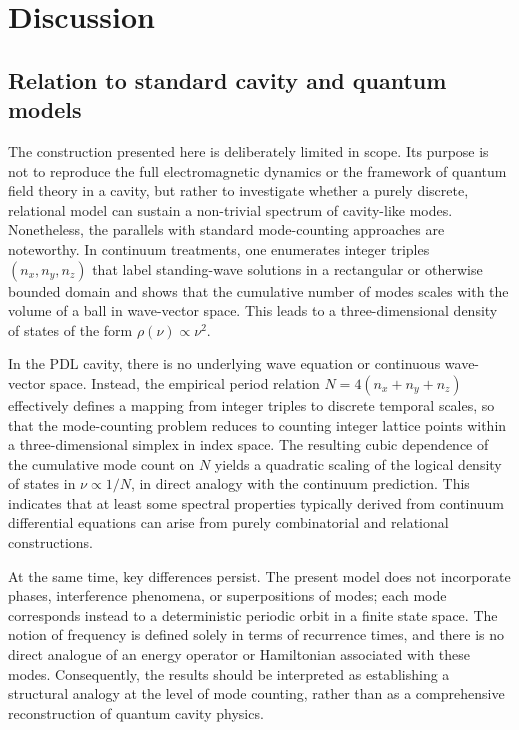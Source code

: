 \documentclass{article}
\theoremstyle{definition}
\begin{document}
\section{Discussion}

\subsection{Relation to standard cavity and quantum models}

The construction presented here is deliberately limited in scope. Its purpose is not to reproduce the full electromagnetic dynamics or the framework of quantum field theory in a cavity, but rather to investigate whether a purely discrete, relational model can sustain a non-trivial spectrum of cavity-like modes.\cite{PDL_Main_2026,PDL_Position_2026} Nonetheless, the parallels with standard mode-counting approaches are noteworthy. In continuum treatments, one enumerates integer triples $(n_x,n_y,n_z)$ that label standing-wave solutions in a rectangular or otherwise bounded domain and shows that the cumulative number of modes scales with the volume of a ball in wave-vector space. This leads to a three-dimensional density of states of the form $\rho(\nu) \propto \nu^2$.\cite{Density_of_states_Notes,EM_Cavities_Notes,Counting_States_2021}

In the PDL cavity, there is no underlying wave equation or continuous wave-vector space. Instead, the empirical period relation $N = 4(n_x + n_y + n_z)$ effectively defines a mapping from integer triples to discrete temporal scales, so that the mode-counting problem reduces to counting integer lattice points within a three-dimensional simplex in index space.\cite{Effective_Fields_PDL_2026} The resulting cubic dependence of the cumulative mode count on $N$ yields a quadratic scaling of the logical density of states in $\nu \propto 1/N$, in direct analogy with the continuum prediction.\cite{Density_of_states_Notes} This indicates that at least some spectral properties typically derived from continuum differential equations can arise from purely combinatorial and relational constructions.

At the same time, key differences persist. The present model does not incorporate phases, interference phenomena, or superpositions of modes; each mode corresponds instead to a deterministic periodic orbit in a finite state space.\cite{PDL_Main_2026} The notion of frequency is defined solely in terms of recurrence times, and there is no direct analogue of an energy operator or Hamiltonian associated with these modes. Consequently, the results should be interpreted as establishing a structural analogy at the level of mode counting, rather than as a comprehensive reconstruction of quantum cavity physics.
\end{document}
